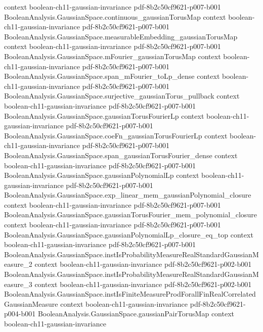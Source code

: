 \begin{theorem}
  {context}
  {boolean-ch11-gaussian-invariance}
  {pdf-8b2c50cf9621-p007-b001}
\proofstep
  {BooleanAnalysis.GaussianSpace.continuous_gaussianTorusMap}
  {context}
  {boolean-ch11-gaussian-invariance}
  {pdf-8b2c50cf9621-p007-b001}
\proofstep
  {BooleanAnalysis.GaussianSpace.measurableEmbedding_gaussianTorusMap}
  {context}
  {boolean-ch11-gaussian-invariance}
  {pdf-8b2c50cf9621-p007-b001}
\proofstep
  {BooleanAnalysis.GaussianSpace.mFourier_gaussianTorusMap}
  {context}
  {boolean-ch11-gaussian-invariance}
  {pdf-8b2c50cf9621-p007-b001}
\proofstep
  {BooleanAnalysis.GaussianSpace.span_mFourier_toLp_dense}
  {context}
  {boolean-ch11-gaussian-invariance}
  {pdf-8b2c50cf9621-p007-b001}
\proofstep
  {BooleanAnalysis.GaussianSpace.surjective_gaussianTorus_pullback}
  {context}
  {boolean-ch11-gaussian-invariance}
  {pdf-8b2c50cf9621-p007-b001}
\proofstep
  {BooleanAnalysis.GaussianSpace.gaussianTorusFourierLp}
  {context}
  {boolean-ch11-gaussian-invariance}
  {pdf-8b2c50cf9621-p007-b001}
\proofstep
  {BooleanAnalysis.GaussianSpace.coeFn_gaussianTorusFourierLp}
  {context}
  {boolean-ch11-gaussian-invariance}
  {pdf-8b2c50cf9621-p007-b001}
\proofstep
  {BooleanAnalysis.GaussianSpace.span_gaussianTorusFourier_dense}
  {context}
  {boolean-ch11-gaussian-invariance}
  {pdf-8b2c50cf9621-p007-b001}
\proofstep
  {BooleanAnalysis.GaussianSpace.gaussianPolynomialLp}
  {context}
  {boolean-ch11-gaussian-invariance}
  {pdf-8b2c50cf9621-p007-b001}
\proofstep
  {BooleanAnalysis.GaussianSpace.exp_linear_mem_gaussianPolynomial_closure}
  {context}
  {boolean-ch11-gaussian-invariance}
  {pdf-8b2c50cf9621-p007-b001}
\proofstep
  {BooleanAnalysis.GaussianSpace.gaussianTorusFourier_mem_polynomial_closure}
  {context}
  {boolean-ch11-gaussian-invariance}
  {pdf-8b2c50cf9621-p007-b001}
\proofstep
  {BooleanAnalysis.GaussianSpace.gaussianPolynomialLp_closure_eq_top}
  {context}
  {boolean-ch11-gaussian-invariance}
  {pdf-8b2c50cf9621-p007-b001}
\proofstep
  {BooleanAnalysis.GaussianSpace.instIsProbabilityMeasureRealStandardGaussianMeasure_2}
  {context}
  {boolean-ch11-gaussian-invariance}
  {pdf-8b2c50cf9621-p002-b001}
\proofstep
  {BooleanAnalysis.GaussianSpace.instIsProbabilityMeasureRealStandardGaussianMeasure_3}
  {context}
  {boolean-ch11-gaussian-invariance}
  {pdf-8b2c50cf9621-p002-b001}
\proofstep
  {BooleanAnalysis.GaussianSpace.instIsFiniteMeasureProdForallFinRealCorrelatedGaussianMeasure}
  {context}
  {boolean-ch11-gaussian-invariance}
  {pdf-8b2c50cf9621-p004-b001}
\proofstep
  {BooleanAnalysis.GaussianSpace.gaussianPairTorusMap}
  {context}
  {boolean-ch11-gaussian-invariance}

\end{theorem}
